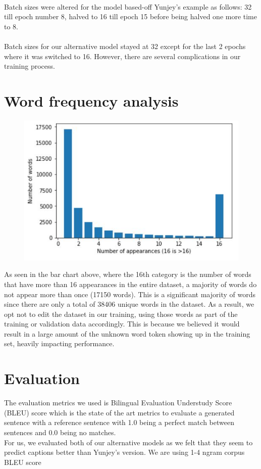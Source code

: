 \documentclass{proc}
\begin{document}
\paragraph{} Batch sizes were altered for the model based-off Yunjey's example as follows: 32 till epoch number 8, halved to 16 till epoch 15 before being halved one more time to 8.
\paragraph{} Batch sizes for our alternative model stayed at 32 except for the last 2 epochs where it was switched to 16. However, there are several complications in our training process.
\section{Word frequency analysis}
\begin{figure}[h!]
  \includegraphics[width=\linewidth]{barchar.JPG}
\end{figure}
As seen in the bar chart above, where the 16th category is the number of words that have more than 16 appearances in the entire dataset, a majority of words do not appear more than once (17150 words). This is a significant majority of words since there are only a total of 38406 unique words in the dataset. As a result, we opt not to edit the dataset in our training, using those words as part of the training or validation data accordingly. This is because we believed it would result in a large amount of the unknown word token showing up in the training set, heavily impacting performance. 
\section{Evaluation}
The evaluation metrics we used is Bilingual Evaluation Understudy Score (BLEU) score which is the state of the art metrics to evaluate a generated sentence with a reference sentence with 1.0 being a perfect match between sentences and 0.0 being no matches.\\
For us, we evaluated both of our alternative models as we felt that they seem to predict captions better than Yunjey's version. We are using 1-4 ngram corpus BLEU score\\
\end{document}

